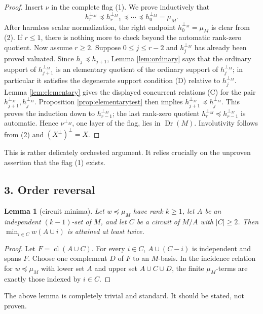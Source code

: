 \documentclass[12pt]{article}
\newcommand{\Dr}{\operatorname{Dr}}
\newcommand{\cl}{\operatorname{cl}}
\newtheorem{lemma}{Lemma}
\newcommand{\review}[1]{\begin{reviewbox}#1\end{reviewbox}}
\begin{document}
\begin{proof}
Insert $\nu$ in the complete flag (1).  We prove inductively that
\[
        h_r^{\perp_M}\preceq h_{r-1}^{\perp_M}\preceq\cdots
        \preceq h_0^{\perp_M}=\mu_M .
\]
After harmless scalar normalization, the right endpoint
$h_0^{\perp_M}=\mu_M$ is clear from (2).  If $r\le1$, there is
nothing more to check beyond the automatic rank-zero quotient.  Now assume $r\ge2$.
Suppose $0\le j\le r-2$ and $h_j^{\perp_M}$ has
already been proved valuated.  Since $h_j\preceq h_{j+1}$, Lemma
\ref{lem:ordinary} says that the ordinary support of
$h_{j+1}^{\perp_M}$ is an elementary quotient of the ordinary support of
$h_j^{\perp_M}$; in particular it satisfies the degenerate support
condition (D) relative to $h_j^{\perp_M}$.  Lemma
\ref{lem:elementary} gives the displayed concurrent relations (C) for
the pair $h_{j+1}^{\perp_M},h_j^{\perp_M}$.  Proposition
\ref{prop:elementarytest} then implies
$h_{j+1}^{\perp_M}\preceq h_j^{\perp_M}$.  This proves the induction
down to $h_{r-1}^{\perp_M}$; the last rank-zero quotient
$h_r^{\perp_M}\preceq h_{r-1}^{\perp_M}$ is automatic.  Hence $\nu^{\perp_M}$, one layer of the flag, lies in
$\Dr(M)$.  Involutivity follows from (2) and $(X^\perp)^\perp=X$.
\end{proof}
\review{This is rather delicately orchested argument. It relies crucially on the unproven assertion that the flag (1) exists.}

\subsection*{3. Order reversal}

\begin{lemma}[circuit minima]\label{lem:circuit}
Let $w\preceq\mu_M$ have rank $k\ge1$, let $A$ be an independent
$(k-1)$-set of $M$, and let $C$ be a circuit of $M/A$ with $|C|\ge2$.
Then $\min_{i\in C}w(A\cup i)$ is attained at least twice.
\end{lemma}

\begin{proof}
Let $F=\cl(A\cup C)$.  For every $i\in C$, $A\cup(C-i)$ is independent
and spans $F$.  Choose one complement $D$ of $F$ to an $M$-basis.  In
the incidence relation for $w\preceq\mu_M$ with lower set $A$ and upper
set $A\cup C\cup D$, the finite $\mu_M$-terms are exactly those indexed
by $i\in C$.
\end{proof}
\review{The above lemma is completely trivial and standard. It should be stated, not proven.}
\end{document}
